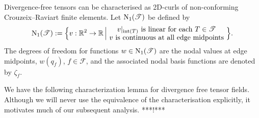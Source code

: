 \documentclass[12pt, reqno, a4paper]{amsart}
\numberwithin{equation}{section}
\numberwithin{theorem}{section}
\numberwithin{remark}{section}
\begin{document}
Divergence-free tensors can be characterised as 2D-curls of
non-conforming Crouzeix--Raviart finite elements. Let ${{\rm N}_1}({\mathscr{T}})$ be
defined by
\begin{displaymath}
  {{\rm N}_1}({\mathscr{T}}):=\Big\{v:{\mathbb{R}}^2\to{\mathbb{R}}\,\Big{|}
  \substack{\mbox{$v|_{\text{int}(T)}$ is linear for each $T\in{\mathscr{T}}$} \\
    \mbox{ $v$ is continuous at all edge midpoints }}\Big\}.
\end{displaymath}
The degrees of freedom for functions $w \in {{\rm N}_1}({\mathscr{T}})$ are the nodal
values at edge midpoints, $w(q_f)$, $f \in {\mathscr{F}}$, and the associated
nodal basis functions are denoted by $\zeta_f$.

We have the following characterization lemma
\cite{PolthierPreuss:2002} for divergence free tensor fields.
Although we will never use the equivalence of the characterisation
explicitly, it motivates much of our subsequent analysis. ***!***
\end{document}
